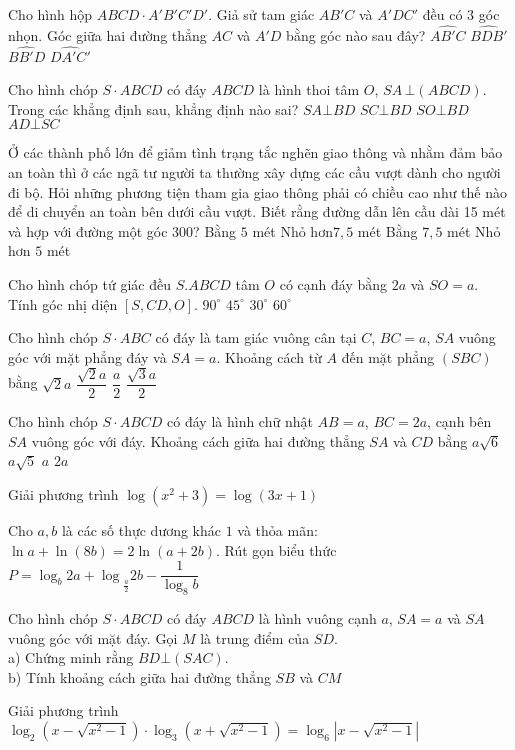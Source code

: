 \begin{ex}
Cho hình hộp $ABCD \cdot A'B'C'D'$. Giả sử tam giác $AB'C$ và $A'DC'$ đều có 3 góc nhọn. Góc giữa hai đường thẳng $AC$ và $A'D$ bằng góc nào sau đây?
\choice
{$\widehat{AB'C}$}
{$\widehat{BDB'}$}
{$\widehat{BB'D}$}
{$\widehat{DA'C'}$}
\end{ex}
\begin{ex}
Cho hình chóp $S \cdot ABCD$ có đáy $ABCD$ là hình thoi tâm $O$, $SA\,\bot (ABCD)$. Trong các khẳng định sau, khẳng định nào sai?
\choice
{$SA\bot BD$}
{$SC\bot BD$}
{$SO\bot BD$}
{$AD\bot SC$}
\end{ex}
\begin{ex}
Ở các thành phố lớn để giảm tình trạng tắc nghẽn giao thông và nhằm đảm bảo an toàn thì ở các ngã tư người ta thường xây dựng các cầu vượt dành cho người đi bộ. Hỏi những phương tiện tham gia giao thông phải có chiều cao như thế nào để di chuyển an toàn bên dưới cầu vượt. Biết rằng đường dẫn lên cầu dài 15 mét và hợp với đường một góc 300?
\choice
{Bằng $5$ mét}
{Nhỏ hơn$7{,}5$ mét}
{Bằng $7{,}5$ mét}
{Nhỏ hơn $5$ mét}
\end{ex}
\begin{ex}
Cho hình chóp tứ giác đều $S.ABCD$ tâm $O$ có cạnh đáy bằng $2a$ và $SO=a$. Tính góc nhị diện $\left[S, CD, O\right]$.
\choice
{$90^\circ $}
{$45^\circ $}
{$30^\circ$}
{$60^\circ $}
\end{ex}
\begin{ex}
Cho hình chóp $S \cdot ABC$ có đáy là tam giác vuông cân tại $C$, $BC=a$, $SA$ vuông góc với mặt phẳng đáy và $SA=a$. Khoảng cách từ $A$ đến mặt phẳng $(SBC)$ bằng
\choice
{$\sqrt{2}a$}
{$\dfrac{\sqrt{2}a}{2}$}
{$\dfrac{a}{2}$}
{$\dfrac{\sqrt{3}a}{2}$}
\end{ex}
\begin{ex}
Cho hình chóp $S \cdot ABCD$ có đáy là hình chữ nhật $AB=a$, $BC=2a$, cạnh bên $SA$ vuông góc với đáy. Khoảng cách giữa hai đường thẳng $SA$ và $CD$ bằng
\choice
{$a\sqrt{6}$}
{$a\sqrt{5}$}
{$a$}
{$2a$}
\end{ex}
\begin{ex}
Giải phương trình $\log \left(x^2+3\right)=\log (3x+1)$
\end{ex}
\begin{ex}
Cho $a,b$ là các số thực dương khác $1$ và thỏa mãn: $\ln a+\ln (8b)=2\ln (a+2b)$.
Rút gọn biểu thức $P={{\log _b2a+\log }_{\tfrac{a}{2}}}2b-\dfrac{1}{\log _8b}$
\end{ex}
\begin{ex}
Cho hình chóp $S \cdot ABCD$ có đáy $ABCD$ là hình vuông cạnh $a$, $SA=a$ và $SA$ vuông góc với mặt đáy. Gọi $M$ là trung điểm của $SD$.\\ 
a) Chứng minh rằng $BD\bot (SAC)$.\\
b) Tính khoảng cách giữa hai đường thẳng $SB$ và $CM$\\
\end{ex}
\begin{ex}
Giải phương trình $\log _2\left(x-\sqrt{x^2-1}\right) \cdot \log _3\left(x+\sqrt{x^2-1}\right)=\log _6\left| x-\sqrt{x^2-1} \right|$
\end{ex}
